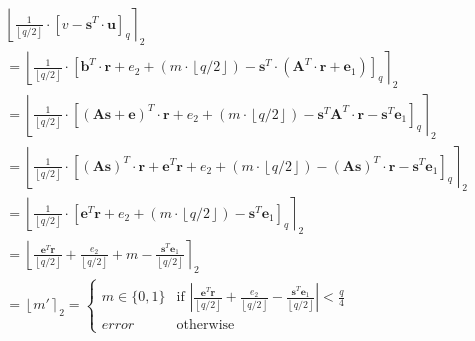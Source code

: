 \begin{align*}
   & \left\lfloor \frac{1}{\left\lfloor q/2\right\rfloor}\cdot \left[v-\textbf{s}^T \cdot \textbf{u}\right]_q\right\rceil _2                                                                                                                                                                                                              \\
   & = \left\lfloor \frac{1}{\left\lfloor q/2\right\rfloor}\cdot \left[\textbf{b}^T \cdot \textbf{r} + e_2 + (m\cdot \left\lfloor q/2\right\rfloor)-\textbf{s}^T \cdot (\textbf{A}^T \cdot \textbf{r} + \textbf{e}_1)\right]_q \right\rceil _2                                                                                            \\
   & = \left\lfloor \frac{1}{\left\lfloor q/2\right\rfloor}\cdot \left[(\textbf{As}+\textbf{e})^T \cdot \textbf{r} + e_2 + (m\cdot \left\lfloor q/2\right\rfloor)-\textbf{s}^T \textbf{A}^T \cdot \textbf{r} - \textbf{s}^T \textbf{e}_1\right]_q \right\rceil _2                                                                         \\
   & = \left\lfloor \frac{1}{\left\lfloor q/2\right\rfloor}\cdot \left[(\textbf{As})^T \cdot \textbf{r} + \textbf{e}^T\textbf{r}+ e_2 + (m\cdot \left\lfloor q/2\right\rfloor)-(\textbf{As})^T \cdot \textbf{r} - \textbf{s}^T \textbf{e}_1\right]_q\right\rceil _2                                                                       \\
   & = \left\lfloor \frac{1}{\left\lfloor q/2\right\rfloor}\cdot \left[\textbf{e}^T\textbf{r}+ e_2 + (m\cdot \left\lfloor q/2\right\rfloor)- \textbf{s}^T \textbf{e}_1\right]_q\right\rceil _2                                                                                                                                            \\
   & = \left\lfloor \frac{\textbf{e}^T\textbf{r}}{\left\lfloor q/2\right\rfloor}+ \frac{e_2 }{\left\lfloor q/2\right\rfloor}+ m - \frac{\textbf{s}^T \textbf{e}_1}{\left\lfloor q/2\right\rfloor}\right\rceil _2                                                                                                                          \\
   & = \left\lfloor m' \right\rceil _2  = \begin{cases}
                                            m \in \{0,1\} & \text{if } \left\lvert \frac{\textbf{e}^T\textbf{r}}{\left\lfloor q/2\right\rfloor}+ \frac{e_2 }{\left\lfloor q/2\right\rfloor} - \frac{\textbf{s}^T \textbf{e}_1}{\left\lfloor q/2\right\rfloor}\right\rvert  < \frac{q}{4} \\
                                            error         & \text{otherwise}
                                          \end{cases}
\end{align*}

